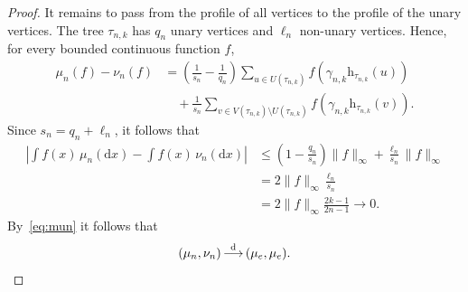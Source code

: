 \documentclass[english,11pt]{smfart}
\newcommand{\convdis}{\,{\buildrel \mathrm{d} \over \longrightarrow}\,}
\newcommand{\he}{\mathrm{h}}
\numberwithin{equation}{section}
\begin{document}
\begin{proof}
	It remains to pass from the profile of all vertices to the profile of the unary vertices. The tree $\tau_{n,k}$ has $q_n$ unary vertices and $\ell_n$ non-unary vertices. Hence, for every bounded continuous function $f$,
	\begin{align*}
		\mu_n(f)-\nu_n(f) &= \left(\frac{1}{s_n}-\frac{1}{q_n}\right) \sum_{u\in U(\tau_{n,k})} f\left(\gamma_{n,k}\he_{\tau_{n,k}}(u)\right)\\
		&\quad+ \frac{1}{s_n} \sum_{v\in V(\tau_{n,k})\setminus U(\tau_{n,k})} f\left(\gamma_{n,k}\he_{\tau_{n,k}}(v)\right).
	\end{align*}
	Since $s_n=q_n+\ell_n$, it follows that
	\begin{align*}
		\left|\int f(x)\,\mu_n(\mathrm{d}x)  - \int f(x)\,\nu_n(\mathrm{d}x) \right| &\le \left(1 - \frac{q_n}{s_n} \right) \|f\|_\infty + \frac{\ell_n}{s_n} \|f\|_\infty \\
		&= 2\|f\|_\infty\frac{\ell_n}{s_n} \\
		&= 2\|f\|_\infty\frac{2k-1}{2n-1} \to 0.
	\end{align*}
	By~\eqref{eq:mun} it follows that
	\[
		(\mu_n,\nu_n) \convdis (\mu_e,\mu_e).
	\]
\end{proof}
\end{document}
